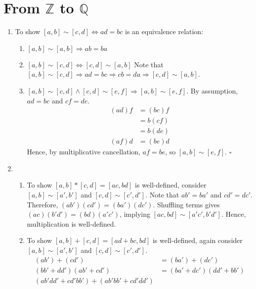 \documentclass{article}
\newcommand{\Z}{\mathbb{Z}}
\newcommand{\Q}{\mathbb{Q}}
\begin{document}
\section{From $\Z$ to $\Q$}
  \begin{enumerate}[label=\textbf{(\alph*)}]
    \item{
      To show $[a,b]\sim[c,d] \Leftrightarrow ad=bc$ is an equivalence relation:
      \begin{enumerate}[label=(\arabic*)]
        \item{
          $[a,b]\sim[a,b] \Rightarrow ab=ba$
        }
        \item{
          $[a,b]\sim[c,d]\Leftrightarrow[c,d]\sim[a,b]$ Note that
          $[a,b]\sim[c,d]
            \Rightarrow ad = bc
            \Rightarrow cb = da
            \Rightarrow [c,d]\sim[a,b]
          $.
        }
        \item{
          $[a,b]\sim[c,d]\wedge[c,d]\sim[e,f]\Rightarrow[a,b]\sim[e,f]$. By
          assumption, $ad=bc$ and $cf=de$.
          \begin{align*}
            (ad)f &= (bc)f \\
                  &= b(cf) \\
                  &= b(de) \\
            (af)d &= (be)d
          \end{align*}
          Hence, by multiplicative cancellation, $af=be$, so $[a,b]\sim[e,f]$.
          \hfill $\square$
        }
      \end{enumerate}
    }
    \item{
      \begin{enumerate}[label=(\arabic*)]
        \item{
          To show $[a,b]*[c,d]=[ac,bd]$ is well-defined, consider $[a,b]\sim
          [a',b']$ and $[c,d]\sim[c',d']$. Note that $ab'=ba'$ and $cd'=dc'$.
          Therefore, $(ab')(cd')=(ba')(dc')$. Shuffling terms gives $(ac)(b'd')=
          (bd)(a'c')$, implying $[ac,bd]\sim[a'c',b'd']$. Hence, multiplication
          is well-defined.
        }
        \item{
          To show $[a,b]+[c,d]=[ad+bc,bd]$ is well-defined, again consider
          $[a,b]\sim[a',b']$ and $[c,d]\sim[c',d']$.
          \begin{align*}
            (ab')+(cd')         &= (ba')+(dc')\\
            (bb'+dd')(ab'+cd')  &= (ba'+dc')(dd'+bb')\\
            (ab'dd'+cd'bb')+(ab'bb'+cd'dd')

\end{align*}}
\end{enumerate}}
\end{enumerate}
\end{document}
